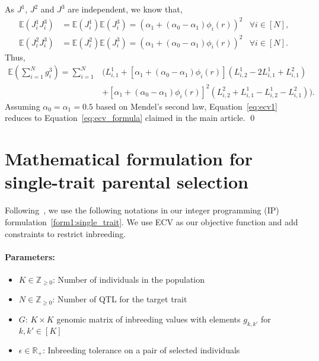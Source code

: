 \documentclass[12pt, a4paper, bibliography=totoc]{scrartcl}
\makeatletter
\let\saveqed\qed
\renewcommand\qed{%
   \ifmmode\displaymath@qed
   \else\saveqed
   \fi}
\makeatother
\begin{document}
As $J^1$, $J^2$ and $J^3$ are independent, we know that,
\begin{align*}
     \mathbb{E}(J_i^1J_i^3)& =\mathbb{E}(J_i^1) \mathbb{E}(J_i^3) = (    \alpha_1+(\alpha_0-\alpha_1)\phi_i(r))^2 & \forall i \in [N],\\
      \mathbb{E}(J_i^2J_i^3)& =\mathbb{E}(J_i^2) \mathbb{E}(J_i^3) = (    \alpha_1+(\alpha_0-\alpha_1)\phi_i(r))^2 & \forall i \in [N].
\end{align*}
Thus, 
\begin{align}
    \nonumber \mathbb{E}\left(\sum_{i=1}^{N}g_i^{3}\right)=\sum_{i=1}^{N}& \bigg(L^{1}_{i,1}+[\alpha_1+(\alpha_0-\alpha_1)\phi_i(r)](L^{1}_{i,2}-2L^{1}_{i,1}+L^{2}_{i,1})\\
    &+[\alpha_1+(\alpha_0-\alpha_1)\phi_i(r)]^2(L^{2}_{i,2}+L^{1}_{i,1}-L^{1}_{i,2}-L^{2}_{i,1})\bigg). \label{eq:ecv1}
\end{align}
Assuming  $\alpha_0=\alpha_1=0.5$ based on Mendel's second law,  Equation~\eqref{eq:ecv1} reduces to Equation~\eqref{eq:ecv_formula} claimed in the main article.
\qed



\section*{Mathematical formulation for  single-trait parental selection}
Following~\cite{han2017predicted}, we use the following notations in our integer programming (IP) formulation~\eqref{form1:single_trait}. We use  ECV as our objective function and add constraints to restrict inbreeding.
 \paragraph{Parameters:}
		\begin{itemize}
			\item $K \in \mathbb{Z}_{\ge0}$: Number of individuals in the population
			\item $N \in \mathbb{Z}_{\ge0}$: Number of QTL for the target trait
			\item $G$: $K \times K$ genomic matrix of inbreeding values with elements $g_{k,k'}$ for $k, k' \in [K]$			
			\item $\epsilon \in \mathbb{R_+}$: Inbreeding tolerance on a pair of selected individuals
	\iffalse %
			\item $P^k \in \mathbb{B}^{N\times2}$: The population matrix for each individual $k\in[K]$, where:
	\begin{align*}
		P_{i,j}^{k} &=
		\left\{
		\begin{array}{ll}
		0, & \text{ if $L^{k}_{i,j} = 0$},\\
		1, & \text{otherwise,}
		\end{array}
		\right. &\forall i \in [N], j \in [2].
	\end{align*}
	\fi
		\end{itemize}
\end{document}
